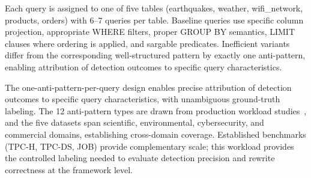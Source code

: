 \documentclass[conference]{IEEEtran}
\begin{document}
\begin{table}[t]
\caption{Anti-pattern Coverage in Workload}
\label{tab:antipatterns_coverage}
\centering
\small
{}
\end{table}

Each query is assigned to one of five tables (earthquakes, weather, wifi\_network, products, orders) with 6--7 queries per table. Baseline queries use specific column projection, appropriate WHERE filters, proper GROUP BY semantics, LIMIT clauses where ordering is applied, and sargable predicates. Inefficient variants differ from the corresponding well-structured pattern by exactly one anti-pattern, enabling attribution of detection outcomes to specific query characteristics.

The one-anti-pattern-per-query design enables precise attribution of detection outcomes to specific query characteristics, with unambiguous ground-truth labeling. The 12 anti-pattern types are drawn from production workload studies~\cite{bress2025snowflake,gcpantipattern}, and the five datasets span scientific, environmental, cybersecurity, and commercial domains, establishing cross-domain coverage. Established benchmarks (TPC-H, TPC-DS, JOB) provide complementary scale; this workload provides the controlled labeling needed to evaluate detection precision and rewrite correctness at the framework level.
\end{document}
